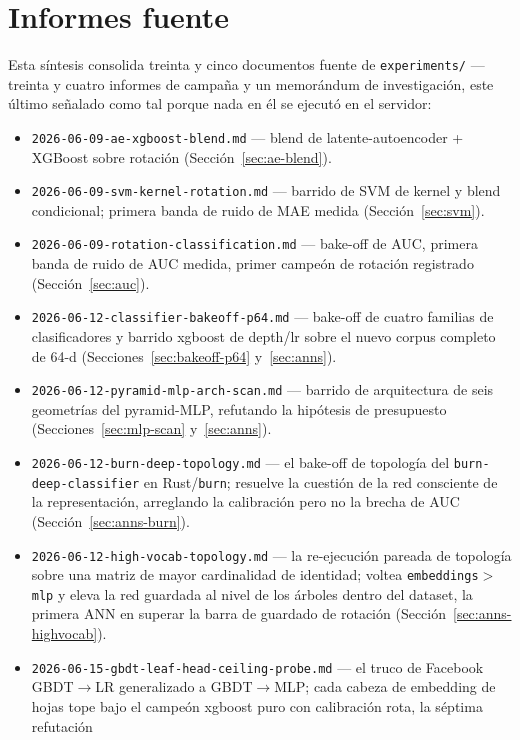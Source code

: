 \documentclass[11pt]{article}
\begin{document}
\section{Informes fuente}
Esta síntesis consolida treinta y cinco documentos fuente de \texttt{experiments/}
--- treinta y cuatro informes de campaña y un memorándum de investigación, este
último señalado como tal porque nada en él se ejecutó en el servidor:
\begin{itemize}
  \item \texttt{2026-06-09-ae-xgboost-blend.md} --- blend de latente-autoencoder +
    XGBoost sobre rotación (Sección~\ref{sec:ae-blend}).
  \item \texttt{2026-06-09-svm-kernel-rotation.md} --- barrido de SVM de kernel y
    blend condicional; primera banda de ruido de MAE medida (Sección~\ref{sec:svm}).
  \item \texttt{2026-06-09-rotation-classification.md} --- bake-off de AUC, primera
    banda de ruido de AUC medida, primer campeón de rotación registrado
    (Sección~\ref{sec:auc}).
  \item \texttt{2026-06-12-classifier-bakeoff-p64.md} --- bake-off de cuatro
    familias de clasificadores y barrido xgboost de depth/lr sobre el nuevo corpus
    completo de 64-d (Secciones~\ref{sec:bakeoff-p64} y~\ref{sec:anns}).
  \item \texttt{2026-06-12-pyramid-mlp-arch-scan.md} --- barrido de arquitectura de
    seis geometrías del pyramid-MLP, refutando la hipótesis de presupuesto
    (Secciones~\ref{sec:mlp-scan} y~\ref{sec:anns}).
  \item \texttt{2026-06-12-burn-deep-topology.md} --- el bake-off de topología del
    \texttt{burn-deep-classifier} en Rust/\texttt{burn}; resuelve la cuestión de la
    red consciente de la representación, arreglando la calibración pero no la brecha
    de AUC (Sección~\ref{sec:anns-burn}).
  \item \texttt{2026-06-12-high-vocab-topology.md} --- la re-ejecución pareada de
    topología sobre una matriz de mayor cardinalidad de identidad; voltea
    \texttt{embeddings}$>$\texttt{mlp} y eleva la red guardada al nivel de los
    árboles dentro del dataset, la primera ANN en superar la barra de guardado de
    rotación (Sección~\ref{sec:anns-highvocab}).
  \item \texttt{2026-06-15-gbdt-leaf-head-ceiling-probe.md} --- el truco de Facebook
    GBDT$\to$LR generalizado a GBDT$\to$MLP; cada cabeza de embedding de hojas tope
    bajo el campeón xgboost puro con calibración rota, la séptima refutación

\end{itemize}
\end{document}

